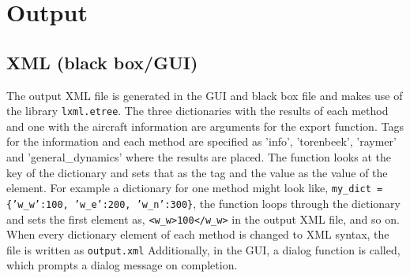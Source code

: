 \section{Output}
\label{sec:output}

\subsection{XML (black box/GUI)}
The output XML file is generated in the GUI  and black box file  and makes use of the library \texttt{lxml.etree}.
The three dictionaries with the results of each method and one with the aircraft information are arguments for the export function.
Tags for the information and each method are specified as 'info', 'torenbeek', 'raymer' and 'general\_dynamics' where the results are placed.
The function looks at the key of the dictionary and sets that as the tag and the value as the value of the element.
For example a dictionary for one method might look like, \texttt{my\_dict = \{'w\_w':100, 'w\_e':200, 'w\_n':300\}}, the function loops through the dictionary and sets the first element as, \texttt{\textless w\_w\textgreater 100\textless/w\_w\textgreater} in the output XML file, and so on.
When every dictionary element of each method is changed to XML syntax, the file is written as \texttt{output.xml}
Additionally, in the GUI, a dialog function is called, which prompts a dialog message on completion.
